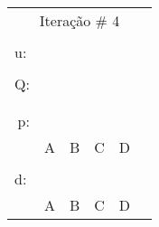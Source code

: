 \documentclass[16pt]{examdesign}
\begin{document}
\begin{fillin}[title={},
                    rearrange=no,resetcounter=no,suppressprefix]
\begin{question}
\begin{multicols}{4}
\begin{tabular}{|llllll|}
  \end{tabular}
  \begin{tabular}{|llllll|}
  \hline
  \multicolumn{6}{|c|}{Iteração \# 4}                                                                                                          \\
					    &                       &                       &                       &                       &  \\
  u:                                        &                       &                       &                       &                       &  \\ \cline{2-3}
					    &                       &                       &                       &                       &  \\ \cline{2-5}
  \multicolumn{1}{|r|}{Q:}                  & \multicolumn{1}{l|}{} & \multicolumn{1}{l|}{} & \multicolumn{1}{l|}{} & \multicolumn{1}{l|}{} &  \\
  \multicolumn{1}{|l|}{}                    & \multicolumn{1}{l|}{} & \multicolumn{1}{l|}{} & \multicolumn{1}{l|}{} & \multicolumn{1}{l|}{} &  \\ \cline{2-5}
					    &                       &                       &                       &                       &  \\ \cline{2-5}
  \multicolumn{1}{|r|}{\multirow{2}{*}{p:}} & \multicolumn{1}{l|}{} & \multicolumn{1}{l|}{} & \multicolumn{1}{l|}{} & \multicolumn{1}{l|}{} &  \\
  \multicolumn{1}{|r|}{}                    & \multicolumn{1}{l|}{} & \multicolumn{1}{l|}{} & \multicolumn{1}{l|}{} & \multicolumn{1}{l|}{} &  \\ \cline{2-5}
					    & A                     & B                     & C                     & D                     &  \\
					    &                       &                       &                       &                       &  \\ \cline{2-5}
  \multicolumn{1}{|l|}{\multirow{2}{*}{d:}} & \multicolumn{1}{l|}{} & \multicolumn{1}{l|}{} & \multicolumn{1}{l|}{} & \multicolumn{1}{l|}{} &  \\
  \multicolumn{1}{|l|}{}                    & \multicolumn{1}{l|}{} & \multicolumn{1}{l|}{} & \multicolumn{1}{l|}{} & \multicolumn{1}{l|}{} &  \\ \cline{2-5}
					    & A                     & B                     & C                     & D                     &  \\ \hline
  \end{tabular}
\end{multicols}



\end{question}
\end{fillin}
\end{document}
